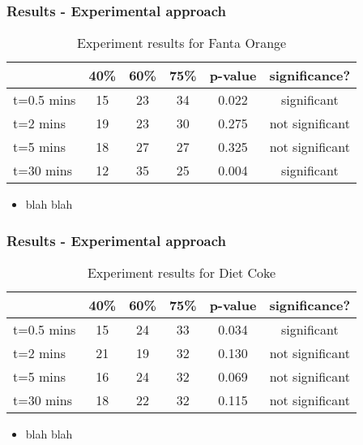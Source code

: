 \documentclass[compress,handout,10pt]{beamer}
\let\olditem\item
\renewcommand{\item}{\setlength{\itemsep}{0.5\baselineskip}\olditem}
\begin{document}
\begin{frame}
    \frametitle{Results - Experimental approach}
\begin{table}[ h]
\centering
\begin{tabular}{ l || c|c|c||c|c }
  &40\% &60\% & 75\% &p-value &significance? \\
\hline  
t=0.5 mins & 15 & 23 & 34&0.022&significant\\ 
\hline  
t=2 mins & 19 & 23 & 30&0.275&not significant\\ 
\hline  
t=5 mins & 18 & 27 & 27&0.325&not significant\\ 
\hline  
t=30 mins & 12 & 35 & 25&0.004&significant\\ 
\hline     
 \end{tabular}
\caption{Experiment results for Fanta Orange}

\end{table}

\begin{itemize}
\item blah blah
\end{itemize}
\end{frame}

\begin{frame}
    \frametitle{Results - Experimental approach}
\begin{table}[ h]
\centering
\begin{tabular}{ l || c|c|c||c|c }
  &40\% &60\% & 75\% &p-value &significance? \\
\hline  
t=0.5 mins & 15 & 24 & 33&0.034&significant\\ 
\hline  
t=2 mins & 21& 19 & 32&0.130 &not significant\\ 
\hline  
t=5 mins & 16 & 24 & 32&0.069&not significant\\ 
\hline  
t=30 mins & 18 & 22& 32&0.115&not significant\\ 
\hline  
 \end{tabular}
\caption{Experiment results for Diet Coke}
\end{table}

\begin{itemize}
\item blah blah
\end{itemize}
\end{frame}
\end{document}
